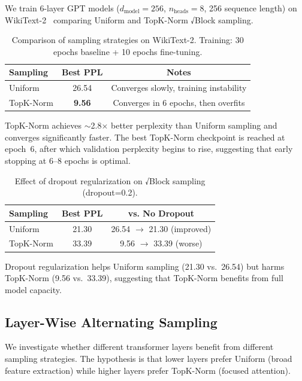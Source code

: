 \documentclass[11pt,a4paper]{article}
\begin{document}
We train 6-layer GPT models ($d_{\text{model}}=256$, $n_{\text{heads}}=8$, 256 sequence length) on WikiText-2~\cite{merity2016pointer} comparing Uniform and TopK-Norm √Block sampling.

\begin{table}[h]
\centering
\caption{Comparison of sampling strategies on WikiText-2. Training: 30 epochs baseline + 10 epochs fine-tuning.}
\label{tab:lm}
\begin{tabular}{lcc}
\toprule
Sampling & Best PPL & Notes \\
\midrule
Uniform      & 26.54 & Converges slowly, training instability \\
TopK-Norm    & \textbf{9.56} & Converges in 6 epochs, then overfits \\
\bottomrule
\end{tabular}
\end{table}

TopK-Norm achieves $\sim$2.8$\times$ better perplexity than Uniform sampling and converges significantly faster. The best TopK-Norm checkpoint is reached at epoch~6, after which validation perplexity begins to rise, suggesting that early stopping at 6--8 epochs is optimal.

\begin{table}[h]
\centering
\caption{Effect of dropout regularization on √Block sampling (dropout=0.2).}
\label{tab:dropout}
\begin{tabular}{lcc}
\toprule
Sampling & Best PPL & vs. No Dropout \\
\midrule
Uniform   & 21.30 & 26.54 $\rightarrow$ 21.30 (improved) \\
TopK-Norm & 33.39 & 9.56 $\rightarrow$ 33.39 (worse) \\
\bottomrule
\end{tabular}
\end{table}

Dropout regularization helps Uniform sampling (21.30 vs.\ 26.54) but harms TopK-Norm (9.56 vs.\ 33.39), suggesting that TopK-Norm benefits from full model capacity.

\subsection{Layer-Wise Alternating Sampling}

We investigate whether different transformer layers benefit from different sampling strategies. The hypothesis is that lower layers prefer Uniform (broad feature extraction) while higher layers prefer TopK-Norm (focused attention).
\end{document}
